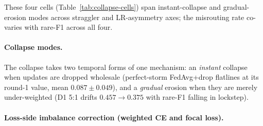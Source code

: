 \documentclass[11pt,a4paper]{report}
\begin{document}
\begin{table}[H]
\centering
\small
\caption{Rare-class collapse across four representative cells spanning the
straggler and learning-rate-asymmetry axes ($n=3$ each). Columns: Rare-F1
(mean F1 over dermato, melanoma, vascular), melanoma recall, melanoma F1, and
rare-to-mel-nevi misrouting. Mel.\ recall reports whether melanoma is recovered
at all; mel.\ F1 adds the precision penalty.}
\label{tab:collapse-cells}
\end{table}

\noindent
These four cells (Table~\ref{tab:collapse-cells}) span instant-collapse and
gradual-erosion modes across straggler and LR-asymmetry axes; the misrouting
rate co-varies with rare-F1 across all four.


\paragraph{Collapse modes.}

The collapse takes two temporal forms of one mechanism: an \emph{instant}
collapse when updates are dropped wholesale (perfect-storm FedAvg+drop flatlines
at its round-1 value, mean $0.087 \pm 0.049$), and a \emph{gradual} erosion when
they are merely under-weighted (D1 5:1 drifts $0.457 \to 0.375$ with rare-F1
falling in lockstep).


\paragraph{Loss-side imbalance correction (weighted CE and focal loss).}
\end{document}
